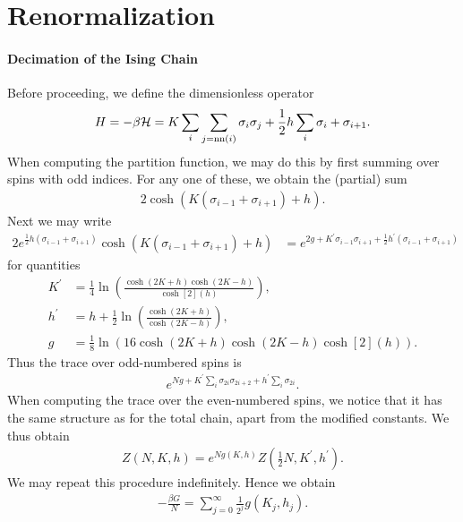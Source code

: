 \section{Renormalization}

\paragraph{Decimation of the Ising Chain}
Before proceeding, we define the dimensionless operator
\begin{align*}
	H = -\beta\mathcal{H} = K\sum\limits_{i}\sum\limits_{j = \text{nn}(i)}\sigma_{i}\sigma_{j} + \frac{1}{2}h\sum\limits_{i}\sigma_{i} + \sigma_{i + 1}.
\end{align*}
When computing the partition function, we may do this by first summing over spins with odd indices. For any one of these, we obtain the (partial) sum
\begin{align*}
	2\cosh(K(\sigma_{i - 1} + \sigma_{i + 1}) + h).
\end{align*}
Next we may write
\begin{align*}
	2e^{\frac{1}{2}h(\sigma_{i - 1} + \sigma_{i + 1})}\cosh(K(\sigma_{i - 1} + \sigma_{i + 1}) + h) &= e^{2g + K^{\prime}\sigma_{i - 1}\sigma_{i + 1} + \frac{1}{2}h^{\prime}(\sigma_{i - 1} + \sigma_{i + 1})}
\end{align*}
for quantities
\begin{align*}
	K^{\prime} &= \frac{1}{4}\ln(\frac{\cosh(2K + h)\cosh(2K - h)}{\cosh[2](h)}), \\
	h^{\prime} &= h + \frac{1}{2}\ln(\frac{\cosh(2K + h)}{\cosh(2K - h)}), \\
	g          &= \frac{1}{8}\ln(16\cosh(2K + h)\cosh(2K - h)\cosh[2](h)).
\end{align*}
Thus the trace over odd-numbered spins is
\begin{align*}
	e^{Ng + K^{\prime}\sum\limits_{i}\sigma_{2i}\sigma_{2i + 2} + h^{\prime}\sum\limits_{i}\sigma_{2i}}.
\end{align*}
When computing the trace over the even-numbered spins, we notice that it has the same structure as for the total chain, apart from the modified constants. We thus obtain
\begin{align*}
	Z(N, K, h) = e^{Ng(K, h)}Z\left(\frac{1}{2}N, K^{\prime}, h^{\prime}\right).
\end{align*}
We may repeat this procedure indefinitely. Hence we obtain
\begin{align*}
	-\frac{\beta G}{N} = \sum\limits_{j = 0}^{\infty}\frac{1}{2^{j}}g(K_{j}, h_{j}).
\end{align*}

